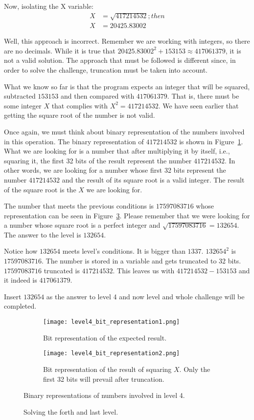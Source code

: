 Now, isolating the X variable:
\begin{equation*}
	\begin{aligned}
		X &= \sqrt{417214532}; then\\
		X &= 20425.83002
	\end{aligned}
\end{equation*}

Well, this approach is incorrect. Remember we are working with integers, so there are no decimals. While it is true that $20425.83002^2 + 153153 \approx 417061379$, it is not a valid solution. The approach that must be followed is different since, in order to solve the challenge, truncation must be taken into account.  

What we know so far is that the program expects an integer that will be squared, subtracted $153153$ and then compared with $417061379$. That is, there must be some integer $X$ that complies with $X^2 = 417214532$. We have seen earlier that getting the square root of the number is not valid. 

Once again, we must think about binary representation of the numbers involved in this operation. The binary representation of $417214532$ is shown in Figure~\ref{fig:level4_bit_representation}. What we are looking for is a number that after multiplying it by itself, i.e., squaring it, the first 32 bits of the result represent the number $417214532$. In other words, we are looking for a number whose first 32 bits represent the number $417214532$ and the result of its square root is a valid integer. The result of the square root is the $X$ we are looking for. 

The number that meets the previous conditions is $17597083716$ whose representation can be seen in Figure~\ref{fig:level4_bit_representation2}. Please remember that we were looking for a number whose square root is a perfect integer and $\sqrt{17597083716} = 132654$. The answer to the level is $132654$.

Notice how $132654$ meets level's conditions. It is bigger than $1337$. $132654^2$ is $17597083716$. The number is stored in a  variable and gets truncated to 32 bits. $17597083716$ truncated is $417214532$. This leaves us with  $417214532 - 153153$ and it indeed is $417061379$. 

Insert $132654$ as the answer to level 4 and now level and whole challenge will be completed. 
\begin{figure}
	\begin{subfigure}[t]{.5\textwidth}
		\centering
		\texttt{[image: level4\_bit\_representation1.png]}
		\caption{Bit representation of the expected result.}
		\label{fig:level4_bit_representation}
	\end{subfigure}
	\begin{subfigure}[t]{.5\textwidth}
		\texttt{[image: level4\_bit\_representation2.png]}
		\caption{Bit representation of the result of squaring $X$. Only the first 32 bits will prevail after truncation.}
		\label{fig:level4_bit_representation2}
	\end{subfigure}
	\caption{Binary representations of numbers involved in level 4.}
\end{figure}

\begin{figure}[!h]
	\caption{Solving the forth and last level.}
	\label{fig:solved_level4}
\end{figure}